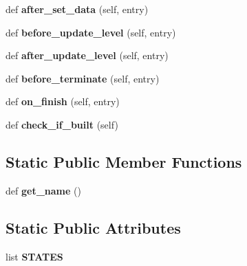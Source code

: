 \begin{DoxyCompactItemize}
def {\bfseries after\+\_\+set\+\_\+data} (self, entry)
\item 
\mbox{\label{class_r_a_i_d5_1_1frontend_1_1services_1_1connect__service_1_1_connect_service_a3fb1b717ca5f27b15841b817caf62d5e}} 
def {\bfseries before\+\_\+update\+\_\+level} (self, entry)
\item 
\mbox{\label{class_r_a_i_d5_1_1frontend_1_1services_1_1connect__service_1_1_connect_service_ab9c25f4a46f8864b5f0190c62a710866}} 
def {\bfseries after\+\_\+update\+\_\+level} (self, entry)
\item 
\mbox{\label{class_r_a_i_d5_1_1frontend_1_1services_1_1connect__service_1_1_connect_service_a25174f4a8af218662a71cd7544c2ee74}} 
def {\bfseries before\+\_\+terminate} (self, entry)
\item 
\mbox{\label{class_r_a_i_d5_1_1frontend_1_1services_1_1connect__service_1_1_connect_service_a47aacb72236592742faad9fd77040130}} 
def {\bfseries on\+\_\+finish} (self, entry)
\item 
\mbox{\label{class_r_a_i_d5_1_1frontend_1_1services_1_1connect__service_1_1_connect_service_a433716ef9ee81d170cf712912d1e67ba}} 
def {\bfseries check\+\_\+if\+\_\+built} (self)
\end{DoxyCompactItemize}
\subsection*{Static Public Member Functions}
\begin{DoxyCompactItemize}
\item 
\mbox{\label{class_r_a_i_d5_1_1frontend_1_1services_1_1connect__service_1_1_connect_service_aca07a530b6f670da26c3d0d2f402116b}} 
def {\bfseries get\+\_\+name} ()
\end{DoxyCompactItemize}
\subsection*{Static Public Attributes}
\begin{DoxyCompactItemize}
\item 
list {\bfseries S\+T\+A\+T\+ES}
\end{DoxyCompactItemize}


